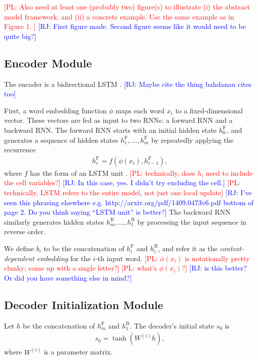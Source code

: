 \documentclass[11pt,letterpaper]{article}
\newcommand{\phiin}{\phi}
\newcommand\pl[1]{\textcolor{red}{[PL: #1]}}
\newcommand\rj[1]{\textcolor{blue}{[RJ: #1]}}
\begin{document}
\pl{
  Also need at least one (probably two) figure(s)
  to illustrate (i) the abstract model framework,
  and (ii) a concrete example.  Use the same example as in Figure 1.
}
\rj{First figure made.  Second figure seems like it would need to be quite big?}


\subsection{Encoder Module}
The encoder is a bidirectional LSTM \cite{bahdanau2014neural}.
\rj{Maybe cite the thing bahdanau cites too}

First, a word embedding function $\phiin$ 
maps each word $x_i$ to a fixed-dimensional vector.
These vectors are fed as input to two RNNs: a forward RNN and a backward RNN.
The forward RNN starts with an initial hidden state $h_0^{\text{F}}$,
and generates a sequence of hidden states $h_1^{\text{F}}, \dotsc, h_m^{\text{F}}$ by
repeatedly applying the recurrence 
\begin{align}
  h_i^{\text{F}} = f(\phiin(x_i), h_{i-1}^{\text{F}}),
\end{align}
where $f$ has the form of an LSTM unit \cite{hochreiter1997lstm}.
\pl{technically, does $h_i$ need to include the cell variables?}
\rj{In this case, yes. I didn't try excluding the cell.}
\pl{technically, LSTM refers to the entire model, not just one local update}
\rj{I've seen this phrasing elsewhere
e.g. http://arxiv.org/pdf/1409.0473v6.pdf bottom of page 2.
Do you think saying ``LSTM unit'' is better?}
The backward RNN similarly generates hidden states $h_m^{\text{B}}, \dotsc, h_1^{\text{B}}$
by processing the input sequence in reverse order.

We define $b_i$ to be the concatenation of $h_i^{\text{F}}$ and $h_i^{\text{B}}$,
and refer it as the \emph{context-dependent embedding} for the $i$-th input word.
\pl{$\phiin(x_i)$ is notationally pretty clunky; come up with a single letter?}
\pl{what's $\phi(x_i)$?}
\rj{is this better?  Or did you have something else in mind?}

\subsection{Decoder Initialization Module}
Let $h$ be the concatenation of $h_m^{\text{F}}$ and $h_1^{\text{B}}$.
The decoder's initial state $s_0$ is
\begin{align}
  s_0 = \tanh(W^{(i)} h),
\end{align}
where $W^{(i)}$ is a parameter matrix.
\end{document}
